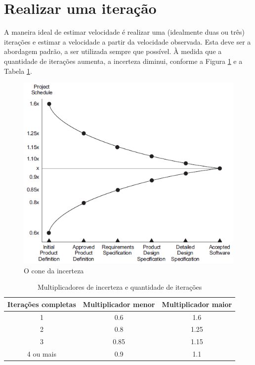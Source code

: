\documentclass[a4paper,abntfigtabnum,noindentfirst]{abnt}
\begin{document}
\section{Realizar uma iteração}

A maneira ideal de estimar velocidade é realizar uma (idealmente duas ou três) iterações e estimar a velocidade a partir da velocidade observada. Esta deve ser a abordagem padrão, a ser utilizada sempre que possível. À medida que a quantidade de iterações aumenta, a incerteza diminui, conforme a Figura \ref{cone-da-incerteza} e a Tabela \ref{multiplicadores-de-incerteza}.


\begin{figure}
  \caption{O cone da incerteza}
  \label{cone-da-incerteza}
  \begin{center}
  \includegraphics[scale=0.6]{cone-da-incerteza}
  \end{center}
\end{figure}

\begin{table}
  \caption{Multiplicadores de incerteza e quantidade de iterações}
  \label{multiplicadores-de-incerteza}
  \begin{center}
    \begin{tabular}{c c c}
      \hline
       \textbf{Iterações completas}&\textbf{Multiplicador menor}&\textbf{Multiplicador maior}\\
      \hline
      1&0.6&1.6\\
      2&0.8&1.25\\
      3&0.85&1.15\\
      4 ou mais&0.9&1.1\\
      \hline
    \end{tabular}
  \end{center}
\end{table}
\end{document}
